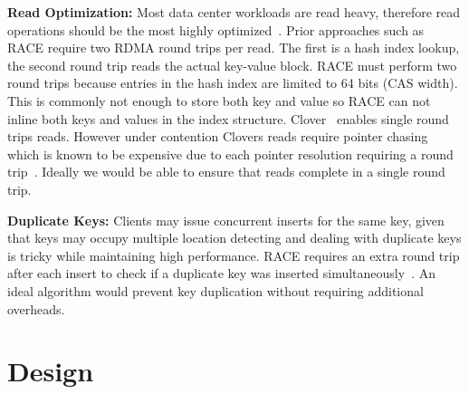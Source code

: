 \textbf{Read Optimization:} Most data center workloads are
read heavy, therefore read operations should be the most
highly optimized~\cite{datacenter-workloads}. Prior
approaches such as RACE require two RDMA round trips per
read. The first is a hash index lookup, the second round
trip reads the actual key-value block. RACE must perform two
round trips because entries in the hash index are limited to
64 bits (CAS width). This is commonly not enough to store
both key and value so RACE can not inline both keys and
values in the index structure. Clover~\cite{clover} enables
single round trips reads. However under contention Clovers
reads require pointer chasing which is known to be expensive
due to each pointer resolution requiring a round
trip~\cite{clio,clover,pointer-chaising}. Ideally we would
be able to ensure that reads complete in a single round
trip.

\textbf{Duplicate Keys:} Clients may issue concurrent
inserts for the same key, given that keys may occupy
multiple location detecting and dealing with duplicate keys
is tricky while maintaining high performance. RACE requires
an extra round trip after each insert to check if a
duplicate key was inserted simultaneously~\cite{race}. An
ideal algorithm would prevent key duplication without
requiring additional overheads.


\section{Design}
\label{sec:design}

